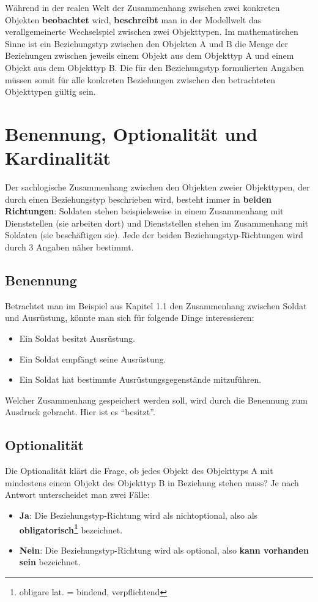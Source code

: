       Während in der realen Welt der Zusammenhang zwischen zwei konkreten Objekten \textbf{beobachtet} wird, \textbf{beschreibt} man in der Modellwelt das verallgemeinerte Wechselspiel zwischen zwei Objekttypen. Im mathematischen Sinne ist ein Beziehungstyp zwischen den Objekten A und B die Menge der Beziehungen zwischen jeweils einem Objekt aus dem Objekttyp A und einem Objekt aus dem Objekttyp B. Die für den Beziehungstyp formulierten Angaben müssen somit für alle konkreten Beziehungen zwischen den betrachteten Objekttypen gültig sein.
      \section{Benennung, Optionalität und Kardinalität}\label{naming_optionaliy_kardinality}
        Der sachlogische Zusammenhang zwischen den Objekten zweier Objekttypen, der durch einen Beziehungstyp beschrieben wird, besteht immer in \textbf{beiden Richtungen}: Soldaten stehen beispielsweise in einem Zusammenhang mit Dienststellen (sie arbeiten dort) und Dienststellen stehen im Zusammenhang mit Soldaten (sie beschäftigen sie). Jede der beiden Beziehungstyp-Richtungen wird durch 3 Angaben näher bestimmt.
        \subsection{Benennung}
          Betrachtet man im Beispiel aus Kapitel 1.1 den Zusammenhang zwischen Soldat und Ausrüstung, könnte man sich für folgende Dinge interessieren:
          \begin{itemize}
            \item Ein Soldat besitzt Ausrüstung.
            \item Ein Soldat empfängt seine Ausrüstung.
            \item Ein Soldat hat bestimmte Ausrüstungsgegenstände mitzuführen.
          \end{itemize}
          Welcher Zusammenhang gespeichert werden soll, wird durch die Benennung zum Ausdruck gebracht.
          Hier ist es \enquote{besitzt}.
        \subsection{Optionalität}
          Die Optionalität klärt die Frage, ob jedes Objekt des Objekttyps A mit mindestens einem Objekt des Objekttyp B in Beziehung stehen muss? Je nach Antwort unterscheidet man zwei Fälle:
          \begin{itemize}
            \item \textbf{Ja}: Die Beziehungstyp-Richtung wird als nichtoptional, also als \textbf{obligatorisch\footnote{obligare lat. = bindend, verpflichtend}} bezeichnet.
            \item \textbf{Nein}: Die Beziehungstyp-Richtung wird als optional, also \textbf{kann vorhanden sein} bezeichnet.
          \end{itemize}
